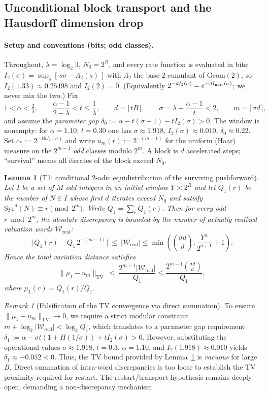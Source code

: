 \documentclass[12pt,a4paper]{article}
\newtheorem{lemma}[theorem]{Lemma}
\theoremstyle{remark}
\newtheorem{remark}[theorem]{Remark}
\begin{document}
\subsection{Unconditional block transport and the Hausdorff dimension drop}
\label{subsec:transport_T1T3}
\paragraph{Setup and conventions (bits; odd classes).}
Throughout, $\lambda=\log_2 3$, $N_0=2^B$, and every rate function is evaluated
in bits: $I_2(\sigma)=\sup_{s}[\,s\sigma-\Lambda_2(s)\,]$ with $\Lambda_2$ the
base-$2$ cumulant of $\mathrm{Geom}(2)$, so $I_2(1.33)\approx0.25498$ and
$I_2(2)=0$. (Equivalently $2^{-dI_2(\sigma)}=e^{-dI_{\rm nats}(\sigma)}$; we never
mix the two.) Fix
\[
1<\alpha<\tfrac2\lambda,\qquad
\frac{\alpha-1}{2-\lambda}<t\le\frac1\lambda,\qquad
d=\lfloor tB\rfloor,\qquad
\sigma=\lambda+\frac{\alpha-1}{t}<2,\qquad m=\lceil\sigma d\rceil,
\]
and assume the \emph{parameter gap}
$\delta_0:=\alpha-t(\sigma+1)-tI_2(\sigma)>0$.
The window is nonempty: for $\alpha=1.10$, $t=0.30$ one has
$\sigma\approx1.918$, $I_2(\sigma)\approx0.010$, $\delta_0\approx0.22$.
Set $c_*:=2^{-BtI_2(\sigma)}$ and write $
u_m(r):=2^{-(m-1)}$ for the uniform
(Haar) measure on the $2^{m-1}$ \emph{odd} classes modulo $2^m$.
A block is $d$ accelerated steps; ``survival'' means all iterates of the block
exceed $N_0$.
\begin{lemma}[T1: conditional $2$-adic equidistribution of the surviving pushforward]
\label{lem:T1}
Let $I$ be a set of $M$ odd integers in an initial window $Y \asymp 2^B$ and let $Q_1(r)$ be the number of
$N\in I$ whose first $d$ iterates exceed $N_0$ and satisfy
$\mathrm{Syr}^d(N)\equiv r\pmod{2^m}$. Write $Q_1=\sum_r Q_1(r)$. Then for
every odd $r\bmod 2^m$, the absolute discrepancy is bounded by the number of actually realized valuation words $\mathcal{W}_{\text{real}}$:
\[
\big|\,Q_1(r)-Q_1\,2^{-(m-1)}\big|\ \le\ |\mathcal{W}_{\text{real}}| \le \min\left(\binom{\sigma d}{d}, \frac{Y^\alpha}{2^{d+1}}+1\right).
\]
Hence the total variation distance satisfies
\[
\|\mu_1-
u_m\|_{\mathrm{TV}}\ \le\ \frac{2^{m-1} |\mathcal{W}_{\text{real}}|}{Q_1} \le \frac{2^{m-1} \binom{\sigma d}{d}}{Q_1},
\]
where $\mu_1(r)=Q_1(r)/Q_1$.
\end{lemma}
\begin{remark}[Falsification of the TV convergence via direct summation]
To ensure $\|\mu_1-
u_m\|_{\mathrm{TV}} \to 0$, we require a strict modular constraint $m + \log_2|\mathcal{W}_{\text{real}}| < \log_2 Q_1$, which translates to a parameter gap requirement $\delta_1 := \alpha - \sigma t(1 + H(1/\sigma)) + t I_2(\sigma) > 0$. However, substituting the operational values $\sigma \approx 1.918$, $t = 0.3$, $\alpha = 1.10$, and $I_2(1.918) \approx 0.010$ yields $\delta_1 \approx -0.052 < 0$. Thus, the TV bound provided by Lemma~\ref{lem:T1} is \emph{vacuous} for large $B$. Direct summation of intra-word discrepancies is too loose to establish the TV proximity required for restart. The restart/transport hypothesis remains deeply open, demanding a non-discrepancy mechanism.
\end{remark}
\end{document}
